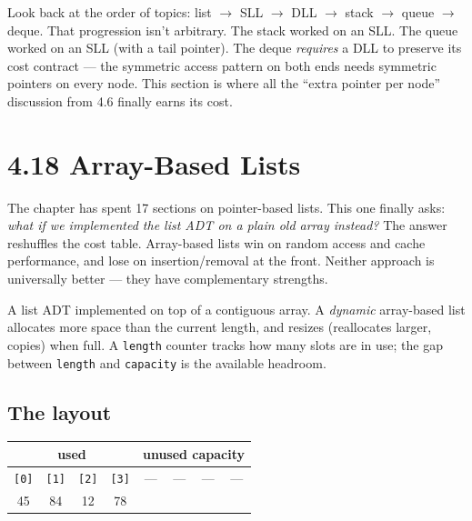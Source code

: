 \documentclass[11pt]{article}
\begin{document}
\begin{ideabox}
Look back at the order of topics: list $\to$ SLL $\to$ DLL $\to$
stack $\to$ queue $\to$ deque. That progression isn't arbitrary.
The stack worked on an SLL. The queue worked on an SLL (with a
tail pointer). The deque \emph{requires} a DLL to preserve its
cost contract --- the symmetric access pattern on both ends needs
symmetric pointers on every node. This section is where all the
``extra pointer per node'' discussion from 4.6 finally earns its
cost.
\end{ideabox}

\section{4.18 Array-Based Lists}

The chapter has spent 17 sections on pointer-based lists. This
one finally asks: \emph{what if we implemented the list ADT on a
plain old array instead?} The answer reshuffles the cost table.
Array-based lists win on random access and cache performance, and
lose on insertion/removal at the front. Neither approach is
universally better --- they have complementary strengths.

\begin{defnbox}
A list ADT implemented on top of a contiguous array. A
\emph{dynamic} array-based list allocates more space than the
current length, and resizes (reallocates larger, copies) when
full. A \texttt{length} counter tracks how many slots are in use;
the gap between \texttt{length} and \texttt{capacity} is the
available headroom.
\end{defnbox}

\subsection*{The layout}

\begin{center}
\begin{tabular}{|c|c|c|c|c|c|c|c|}
\hline
\multicolumn{4}{|c|}{\textbf{used}} & \multicolumn{4}{c|}{\textbf{unused capacity}} \\
\hline
\texttt{[0]} & \texttt{[1]} & \texttt{[2]} & \texttt{[3]} & --- & --- & --- & --- \\
\hline
45 & 84 & 12 & 78 & & & & \\
\hline
\end{tabular}
\end{center}
\end{document}
